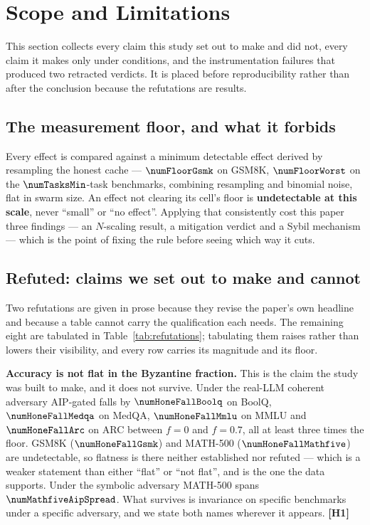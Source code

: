 \section{Scope and Limitations}
\label{sec:limitations}

This section collects every claim this study set out to make and did not, every
claim it makes only under conditions, and the instrumentation failures that
produced two retracted verdicts. It is placed before reproducibility rather than
after the conclusion because the refutations are results.

\subsection{The measurement floor, and what it forbids}

Every effect is compared against a minimum detectable effect derived by
resampling the honest cache --- $\numFloorGsmk$ on GSM8K, $\numFloorWorst$ on the
$\numTasksMin$-task benchmarks, combining resampling and binomial noise, flat in
swarm size. An effect not clearing its cell's floor is \textbf{undetectable at
this scale}, never ``small'' or ``no effect''. Applying that consistently cost
this paper three findings --- an $N$-scaling result, a mitigation verdict and a
Sybil mechanism --- which is the point of fixing the rule before seeing which way
it cuts.

\subsection{Refuted: claims we set out to make and cannot}

Two refutations are given in prose because they revise the paper's own headline
and because a table cannot carry the qualification each needs. The remaining
eight are tabulated in Table~\ref{tab:refutations}; tabulating them raises rather
than lowers their visibility, and every row carries its magnitude and its floor.

\textbf{Accuracy is not flat in the Byzantine fraction.} This is the claim the
study was built to make, and it does not survive. Under the real-LLM coherent
adversary AIP-gated falls by $\numHoneFallBoolq$ on BoolQ, $\numHoneFallMedqa$ on
MedQA, $\numHoneFallMmlu$ on MMLU and $\numHoneFallArc$ on ARC between $f=0$ and
$f=0.7$, all at least three times the floor. GSM8K ($\numHoneFallGsmk$) and
MATH-500 ($\numHoneFallMathfive$) are undetectable, so flatness is there neither
established nor refuted --- which is a weaker statement than either ``flat'' or
``not flat'', and is the one the data supports. Under the symbolic adversary
MATH-500 spans $\numMathfiveAipSpread$. What survives is invariance on specific
benchmarks under a specific adversary, and we state both names wherever it
appears. \textbf{[H1]}

